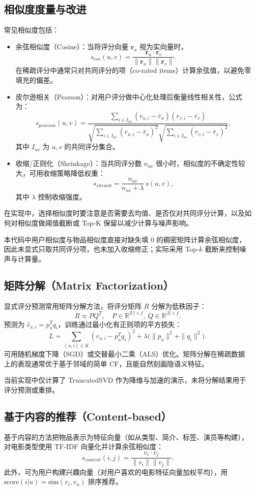 \subsection{相似度度量与改进}
常见相似度包括：
\begin{itemize}
  \item 余弦相似度（Cosine）：当将评分向量 $\mathbf r_u$ 视为实向量时，
  $$s_{cos}(u,v)=\frac{\mathbf r_u\cdot\mathbf r_v}{\|\mathbf r_u\|\|\mathbf r_v\|}.$$ 
  在稀疏评分中通常只对共同评分的项（co-rated items）计算余弦值，以避免零填充的偏差。
  \item 皮尔逊相关（Pearson）：对用户评分做中心化处理后衡量线性相关性，公式为：
  $$s_{pearson}(u,v)=\frac{\sum_{i\in I_{uv}}(r_{u,i}-\bar r_u)(r_{v,i}-\bar r_v)}{\sqrt{\sum_{i\in I_{uv}}(r_{u,i}-\bar r_u)^2}\sqrt{\sum_{i\in I_{uv}}(r_{v,i}-\bar r_v)^2}},$$
  其中 $I_{uv}$ 为 $u,v$ 的共同评分集合。
  \item 收缩/正则化（Shrinkage）：当共同评分数 $n_{uv}$ 很小时，相似度的不确定性较大，可用收缩策略降低权重：
  $$s_{shrunk} = \frac{n_{uv}}{n_{uv}+\lambda}\,s(u,v),$$
  其中 $\lambda$ 控制收缩强度。
\end{itemize}

在实现中，选择相似度时要注意是否需要去均值、是否仅对共同评分计算，以及如何对相似度做阈值截断或 Top-K 保留以减少计算与噪声影响。

本代码中用户相似度与物品相似度直接对缺失填 0 的稠密矩阵计算余弦相似度，因此未显式只取共同评分项，也未加入收缩修正；实际采用 Top-$k$ 截断来控制噪声与计算量。

\subsection{矩阵分解（Matrix Factorization）}
显式评分预测常用矩阵分解方法，将评分矩阵 $R$ 分解为低秩因子：
$$R\approx P Q^T,\quad P\in\mathbb R^{|U|\times f},\ Q\in\mathbb R^{|I|\times f}.$$ 
预测为 $\hat r_{u,i}=p_u^T q_i$，训练通过最小化有正则项的平方损失：
$$L=\sum_{(u,i)\in K}(r_{u,i}-p_u^T q_i)^2+\lambda\bigl(\|p_u\|^2+\|q_i\|^2\bigr).$$
可用随机梯度下降（SGD）或交替最小二乘（ALS）优化。矩阵分解在稀疏数据上的表现通常优于基于邻域的简单 CF，且能自然刻画隐语义特征。

当前实现中仅计算了 TruncatedSVD 作为降维与加速的演示，未将分解结果用于评分预测或重排。

\subsection{基于内容的推荐（Content-based）}
基于内容的方法把物品表示为特征向量（如从类型、简介、标签、演员等构建），对电影类型使用 TF-IDF 向量化并计算余弦相似度：
$$s_{content}(i,j)=\frac{v_i\cdot v_j}{\|v_i\|\|v_j\|}.$$ 
此外，可为用户构建兴趣向量（对用户喜欢的电影特征向量加权平均），用 $\text{score}(i|u)=\text{sim}(v_i, v_u)$ 排序推荐。

